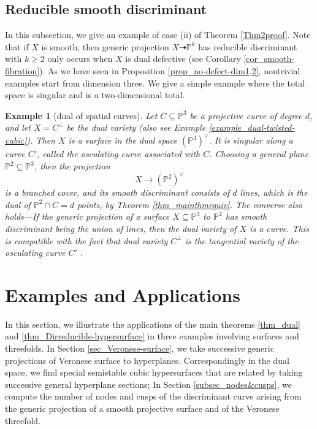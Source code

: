 \documentclass[12pt]{amsart}
\newtheorem{example}[theorem]{Example}
\begin{document}
\subsection{Reducible smooth discriminant} \label{sec_reducible-disc} In this subsection,  we give an example of case (ii) of Theorem \ref{Thm2proof}. Note that if $X$ is smooth, then generic projection $X\dashrightarrow \mathbb P^k$ has reducible discriminant with $k\ge 2$ only occurs when $X$ is dual defective (see Corollary \ref{cor_smooth-fibration}). As we have seen in Proposition \ref{prop_no-defect-dim1,2}, nontrivial examples start from dimension three. We give a simple example where the total space is singular and is a two-dimensional total.

\begin{example}[dual of spatial curves]\normalfont \label{example_dualspatialcurve}
    Let $C\subseteq \mathbb P^3$ be a projective curve of degree $d$, and let $X=C^{\perp}$ be the dual variety (also see Example \ref{example_dual-twisted-cubic}). Then $X$ is a surface in the dual space $(\mathbb P^3)^{\vee}$. It is singular along a curve $C'$, called the osculating curve associated with $C$. Choosing a general plane $\mathbb P^2\subseteq \mathbb P^3$, then the projection
    $$X\to (\mathbb P^2)^{\vee}$$
    is a branched cover, and its smooth discriminant consists of $d$ lines, which is the dual of $\mathbb P^2\cap C=d$ points, by Theorem \ref{thm_mainthmequiv}. The converse also holds—If the generic projection of a surface $X\subseteq \mathbb P^3$ to $\mathbb P^2$ has smooth discriminant being the union of lines, then the dual variety of $X$ is a curve. This is compatible with the fact that dual variety $C^{\perp}$ is the tangential variety of the osculating curve $C'$ \cite[p.640]{Dolgachev-classicalAG}.%
\end{example}


\section{Examples and Applications}\label{sec_example}
In this section, we illustrate the applications of the main theorems \ref{thm_dual} and \ref{thm_Dirreducible-hypersurface} in three examples involving surfaces and threefolds. In Section \ref{sec_Veronese-surface}, we take successive generic projections of Veronese surface to hyperplanes. Correspondingly in the dual space, we find special semistable cubic hypersurfaces that are related by taking successive general hyperplane sections; In Section \ref{subsec_nodes&cusps}, we compute the number of nodes and cusps of the discriminant curve arising from the generic projection of a smooth projective surface and of the Veronese threefold.
\end{document}
